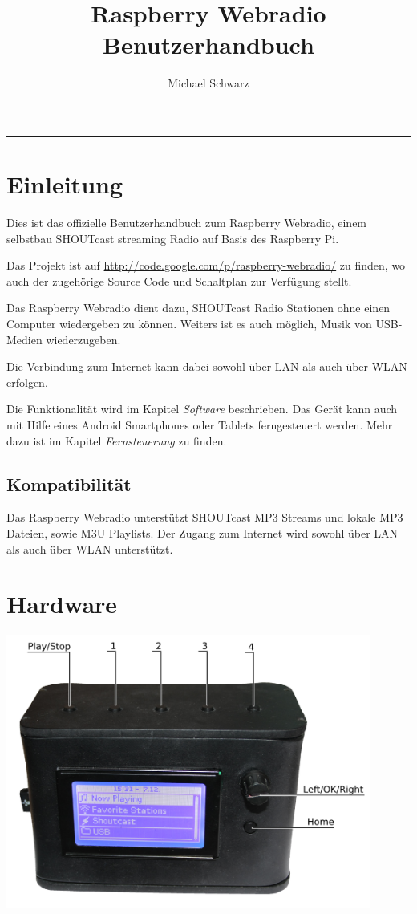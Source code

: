 \documentclass[12pt,a4paper,openany]{memoir}
\title{Raspberry Webradio Benutzerhandbuch}
\author{Michael Schwarz}
\makeatletter
\renewcommand{\maketitle}{\begin{titlingpage}%
    \let\footnotesize\small
    \let\footnoterule\relax
    \parindent \z@
    \reset@font
    \null\vfil
    \begin{flushleft}
      \huge \@title
    \end{flushleft}
    \par
    \hrule height 4pt
    \par
    \begin{flushright}
      \LARGE \@author \par
    \end{flushright}
    \vskip 60\p@
    \vfil\null
  \end{titlingpage}%
  \setcounter{footnote}{0}%
}
\makeatother
\begin{document}
\maketitle

\tableofcontents

\chapter{Einleitung}
Dies ist das offizielle Benutzerhandbuch zum Raspberry Webradio, einem selbstbau SHOUTcast streaming Radio auf Basis des Raspberry Pi.

Das Projekt ist auf \url{http://code.google.com/p/raspberry-webradio/} zu finden, wo auch der zugehörige Source Code und Schaltplan zur Verfügung stellt.

Das Raspberry Webradio dient dazu, SHOUTcast Radio Stationen ohne einen Computer wiedergeben zu können. Weiters ist es auch möglich, Musik von USB-Medien wiederzugeben. 

Die Verbindung zum Internet kann dabei sowohl über LAN als auch über WLAN erfolgen. 

Die Funktionalität wird im Kapitel \textit{Software} beschrieben. Das Gerät kann auch mit Hilfe eines Android Smartphones oder Tablets ferngesteuert werden. 
Mehr dazu ist im Kapitel \textit{Fernsteuerung} zu finden. 


\section{Kompatibilität}
Das Raspberry Webradio unterstützt SHOUTcast MP3 Streams und lokale MP3 Dateien, sowie M3U Playlists. 
Der Zugang zum Internet wird sowohl über LAN als auch über WLAN unterstützt. 

\chapter{Hardware}
 \includegraphics[width=120mm]{images/buttons.png}
\end{document}
